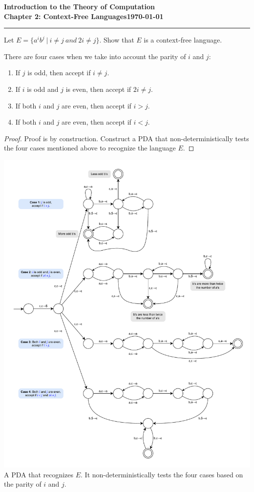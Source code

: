 \documentclass[11pt]{article}
\newcommand{\dated}{\today}
\begin{document}
\textbf{Introduction to the Theory of
Computation}\hfill\textbf{\myname}\\[0.01in]
\textbf{Chapter 2: Context-Free Languages}\hfill\textbf{\dated}\\
\smallskip\hrule\bigskip

\begin{problem}{2.24}
Let $E = \{a^{i}b^{j} \ | \ i \neq j \ and \ 2i \neq j \}$. Show that $E$ is a context-free language.
\end{problem}

\begin{idea}
There are four cases when we take into account the parity of $i$ and $j$: 
\begin{enumerate}
\item If $j$ is odd, then accept if $i \neq j$.
\item If $i$ is odd and $j$ is even, then accept if $2i \neq j$.
\item If both $i$ and $j$ are even, then accept if $i > j$.
\item If both $i$ and $j$ are even, then accept if $i < j$.
\end{enumerate}
\end{idea}

\begin{proof}
Proof is by construction. Construct a PDA that non-deterministically tests the four cases mentioned above to recognize the language $E$.
\end{proof}

\begin{center}
\includegraphics[scale=0.7]{Figures/Problem2.24.pdf} \\
A PDA that recognizes $E$. It non-deterministically tests the four cases based on the parity of $i$ and $j$.
\end{center}
\end{document}
